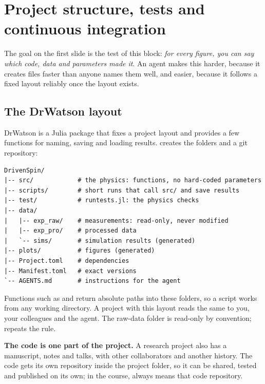 \section{Project structure, tests and continuous integration}\label{sec:structure}


The goal on the first slide is the test of this block: \emph{for every figure, you can say
which code, data and parameters made it}. An agent makes this harder, because it creates
files faster than anyone names them well, and easier, because it follows a fixed layout
reliably once the layout exists.

\subsection{The DrWatson layout}

DrWatson  is a Julia package that fixes a project layout and
provides a few functions for naming, saving and loading results.
 creates the folders and a git repository:
\begin{lstlisting}
DrivenSpin/
|-- src/            # the physics: functions, no hard-coded parameters
|-- scripts/        # short runs that call src/ and save results
|-- test/           # runtests.jl: the physics checks
|-- data/
|   |-- exp_raw/    # measurements: read-only, never modified
|   |-- exp_pro/    # processed data
|   `-- sims/       # simulation results (generated)
|-- plots/          # figures (generated)
|-- Project.toml    # dependencies
|-- Manifest.toml   # exact versions
`-- AGENTS.md       # instructions for the agent
\end{lstlisting}
Functions such as  and  return absolute
paths into these folders, so a script works from any working directory. A project with
this layout reads the same to you, your colleagues and the agent. The raw-data folder is
read-only by convention;  repeats the rule.

\textbf{The code is one part of the project.} A research project also has a manuscript,
notes and talks, with other collaborators and another history. The code gets its own
repository inside the project folder, so it can be shared, tested and published on its
own; in the course,  always means that code repository.

